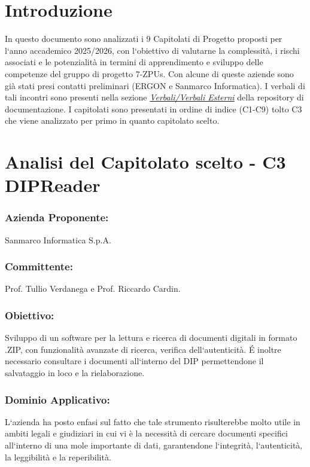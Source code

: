 \documentclass[a4paper,12pt]{article}
\begin{document}
\section{Introduzione}
In questo documento sono analizzati i 9 Capitolati di Progetto proposti per
l`anno accademico 2025/2026, con l`obiettivo di valutarne la complessità, i
rischi associati e le potenzialità in termini di apprendimento e sviluppo delle
competenze del gruppo di progetto 7-ZPUs. Con alcune di queste aziende sono già
stati presi contatti preliminari (ERGON e Sanmarco Informatica). I verbali di
tali incontri sono presenti nella sezione
\href{https://github.com/7-ZPUs/Docs/tree/main/1_Candidatura/Verbali/Verbali\%20Esterni}{\textit{Verbali/Verbali
        Esterni}} della repository di documentazione. \vspace{0.5cm} I capitolati sono
presentati in ordine di indice (C1-C9) tolto C3 che viene analizzato per primo in quanto capitolato scelto.

\section{Analisi del Capitolato scelto - C3 DIPReader}
\subsubsection*{Azienda Proponente:} Sanmarco Informatica S.p.A.
\subsubsection*{Committente:} Prof. Tullio Verdanega e Prof. Riccardo Cardin.
\subsubsection*{Obiettivo:} Sviluppo di un software per la lettura e ricerca di documenti digitali in formato .ZIP, con funzionalità avanzate di ricerca, verifica dell`autenticità. É inoltre necessario consultare i documenti all`interno del DIP permettendone il salvataggio in loco e la rielaborazione.
\subsubsection*{Dominio Applicativo:} L`azienda ha posto enfasi sul fatto che tale strumento risulterebbe molto utile in ambiti legali e giudiziari in cui vi è la necessità di cercare documenti specifici all`interno di una mole importante di dati, garantendone l`integrità, l`autenticità, la leggibilità  e la reperibilità.
\end{document}
